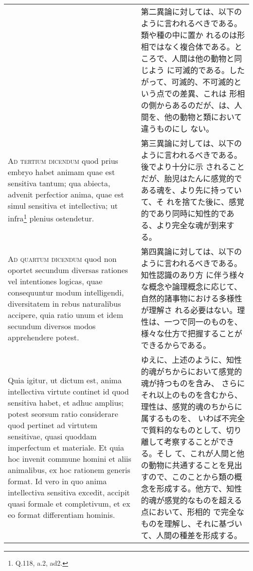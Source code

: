 \documentclass[paper=a4paper,fontsize=10pt,jafontsize=9pt,titlepage]{jlreq}
\begin{document}
\begin{longtable}{p{21em}p{21em}}
 &

 第二異論に対しては、以下のように言われるべきである。類や種の中に置か
 れるのは形相ではなく複合体である。ところで、人間は他の動物と同じよう
 に可滅的である。したがって、可滅的、不可滅的という点での差異、これは
 形相の側からあるのだが、は、人間を、他の動物と類において違うものにし
 ない。
 
\\


{\scshape Ad tertium dicendum} quod prius embryo habet animam quae est
sensitiva tantum; qua abiecta, advenit perfectior anima, quae est
simul sensitiva et intellectiva; ut infra\footnote{Q.118, a.2, ad2.} plenius ostendetur.

&

 第三異論に対しては、以下のように言われるべきである。後でより十分に示
 されることだが、胎児はたんに感覚的である魂を、より先に持っていて、そ
 れを捨てた後に、感覚的であり同時に知性的である、より完全な魂が到来す
 る。
 
\\



{\scshape Ad quartum dicendum} quod non oportet secundum diversas
rationes vel intentiones logicas, quae consequuntur modum
intelligendi, diversitatem in rebus naturalibus accipere, quia ratio
 unum et idem secundum diversos modos apprehendere potest.

 &

 第四異論に対しては、以下のように言われるべきである。知性認識のあり方
に伴う様々な概念や論理概念に応じて、自然的諸事物における多様性が理解さ
れる必要はない。理性は、一つで同一のものを、様々な仕方で把握することが
できるからである。

 \\

Quia igitur, ut dictum est, anima intellectiva virtute continet id
quod sensitiva habet, et adhuc amplius; potest seorsum ratio
considerare quod pertinet ad virtutem sensitivae, quasi quoddam
imperfectum et materiale. Et quia hoc invenit commune homini et aliis
animalibus, ex hoc rationem generis format. Id vero in quo anima
intellectiva sensitiva excedit, accipit quasi formale et completivum,
et ex eo format differentiam hominis.


&

ゆえに、上述のように、知性的魂がちからにおいて感覚的魂が持つものを含み、
さらにそれ以上のものを含むから、理性は、感覚的魂のちからに属するものを、
いわば不完全で質料的なものとして、切り離して考察することができる。そし
て、これが人間と他の動物に共通することを見出すので、このことから類の概
念を形成する。他方で、知性的魂が感覚的なものを超える点において、形相的
で完全なものを理解し、それに基づいて、人間の種差を形成する。
 

\end{longtable}
\end{document}
